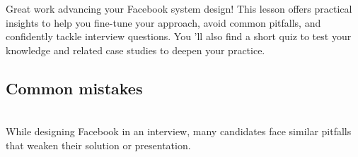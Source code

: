 

Great work advancing your Facebook system design! This lesson offers practical insights to help you fine-tune your approach, avoid common pitfalls, and confidently tackle interview questions. You 'll also find a short quiz to test your knowledge and related case studies to deepen your practice.

\subsection{Common mistakes}\label{Y_vKzl8nfAvETi6YBY-uw}
\\
While designing Facebook in an interview, many candidates face similar pitfalls that weaken their solution or presentation.

